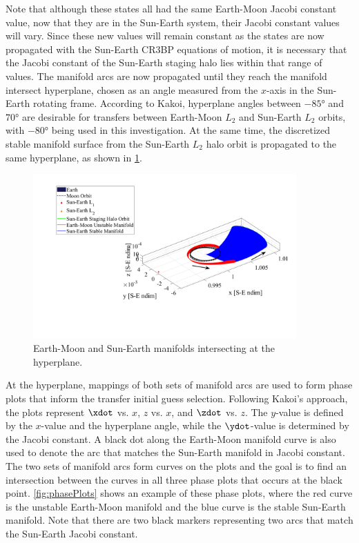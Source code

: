 Note that although these states all had the same Earth-Moon Jacobi constant
value, now that they are in the Sun-Earth system, their Jacobi constant values will vary. Since
these new values will remain constant as the states are now propagated with the Sun-Earth CR3BP
equations of motion, it is necessary that the Jacobi constant of the Sun-Earth staging halo lies
within that range of values. The manifold arcs are now propagated until they reach the manifold
intersect hyperplane, chosen as an angle measured from the $x$-axis in the Sun-Earth rotating
frame. According to Kakoi, hyperplane angles between $-\ang{85}$ and $\ang{70}$ are desirable for
transfers between Earth-Moon $L_{2}$ and Sun-Earth $L_{2}$ orbits, with $\ang{-80}$ being used in
this investigation\cite{Kakoi:2015}. At the same time, the discretized stable manifold surface from
the Sun-Earth $L_{2}$ halo orbit is propagated to the same hyperplane, as shown in
\cref{fig:hyperplane}.

\begin{figure}[ht]
    \centering
    \includegraphics[width=0.9\textwidth]{figures/Hyperplane.pdf}
    \caption{Earth-Moon and Sun-Earth manifolds intersecting at the hyperplane.}
    \label{fig:hyperplane}
\end{figure}

At the hyperplane, mappings of both sets of manifold arcs are used to form phase plots that inform
the transfer initial guess selection. Following Kakoi's approach, the plots represent $\xdot$ vs.
$x$, $z$ vs. $x$, and $\zdot$ vs. $z$. The $y$-value is defined by the $x$-value and the hyperplane
angle, while the $\ydot$-value is determined by the Jacobi constant\cite{Kakoi:2015}. A black dot
along the Earth-Moon manifold curve is also used to denote the arc that matches the Sun-Earth
manifold in Jacobi constant. The two sets of manifold arcs form curves on the plots and the goal is
to find an intersection between the curves in all three phase plots that occurs at the black point.
\cref{fig:phasePlots} shows an example of these phase plots, where the red curve is the unstable
Earth-Moon manifold and the blue curve is the stable Sun-Earth manifold. Note that there are two
black markers representing two arcs that match the Sun-Earth Jacobi constant.

